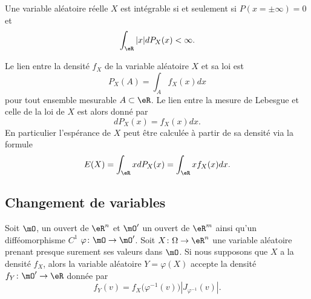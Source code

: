 \begin{proposition}
    Une variable aléatoire réelle \( X\) est intégrable si et seulement si \( P(x=\pm\infty)=0\) et
    \begin{equation}
        \int_{\eR}| x |dP_X(x)<\infty.
    \end{equation}
\end{proposition}

Le lien entre la densité \( f_X\) de la variable aléatoire \( X\) et sa loi est
\begin{equation}
    P_X(A)=\int_Af_X(x)dx
\end{equation}
pour tout ensemble mesurable \( A\subset\eR\). Le lien entre la mesure de Lebesgue et celle de la loi de \( X\) est alors donné par
\begin{equation}
    dP_X(x)=f_X(x)dx.
\end{equation}
En particulier l'espérance de \( X\) peut être calculée à partir de sa densité via la formule
\begin{equation}        \label{EqEspDensform}
    E(X)=\int_{\eR}xdP_X(x)=\int_{\eR}x f_X(x)dx.
\end{equation}

\subsection{Changement de variables}

\begin{theorem}
    Soit \( \mO\), un ouvert de \( \eR^n\) et \( \mO'\) un ouvert de \( \eR^m\) ainsi qu'un difféomorphisme \( C^1\) \( \varphi\colon \mO\to \mO'\). Soit \( X\colon \Omega\to \eR^n\) une variable aléatoire prenant presque surement ses valeurs dans \( \mO\). Si nous supposons que \( X\) a la densité \( f_X\), alors la variable aléatoire \( Y=\varphi(X)\) accepte la densité \( f_Y\colon \mO'\to \eR\) donnée par
    \begin{equation}
        f_Y(v)=f_X\big( \varphi^{-1}(v) \big)| J_{\varphi^{-1}}(v) |.
    \end{equation}
\end{theorem}

